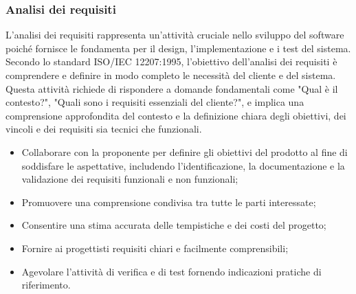 \subsubsection{Analisi dei requisiti}

L'analisi dei requisiti rappresenta un'attività cruciale nello sviluppo del software poiché fornisce le fondamenta per il design, l'implementazione e i test del sistema.
Secondo lo standard ISO/IEC 12207:1995, l'obiettivo dell'analisi dei requisiti è comprendere e definire in modo completo le necessità del cliente e del sistema.
Questa attività richiede di rispondere a domande fondamentali come "Qual è il contesto?", "Quali sono i requisiti essenziali del cliente?", e implica una comprensione approfondita del contesto e la definizione chiara degli obiettivi, dei vincoli e dei requisiti sia tecnici che funzionali.

\begin{itemize}
	\item Collaborare con la proponente per definire gli obiettivi del prodotto al fine di soddisfare le aspettative, includendo l'identificazione, la documentazione e la validazione dei requisiti funzionali e non funzionali;
	\item Promuovere una comprensione condivisa tra tutte le parti interessate;
	\item Consentire una stima accurata delle tempistiche e dei costi del progetto;
	\item Fornire ai progettisti requisiti chiari e facilmente comprensibili;
	\item Agevolare l'attività di verifica e di test fornendo indicazioni pratiche di riferimento.
\end{itemize}

